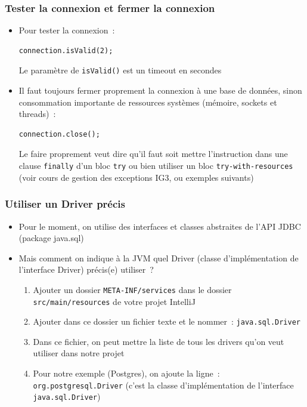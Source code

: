 \documentclass[aspectratio=169,10pt]{beamer}
\begin{document}
\begin{frame}[fragile]
	\frametitle{Tester la connexion et fermer la connexion}
	\begin{itemize}
		\item Pour tester la connexion~:
\begin{lstlisting}
connection.isValid(2);
\end{lstlisting}
Le paramètre de \texttt{isValid()} est un timeout en secondes
		\item Il faut toujours fermer proprement la connexion à une base de données, sinon consommation importante de ressources systèmes (mémoire, sockets et threads)~:
\begin{lstlisting}
connection.close();
\end{lstlisting}
		Le faire proprement veut dire qu'il faut soit mettre l'instruction dans une clause \texttt{finally} d'un bloc \texttt{try} ou bien utiliser un bloc \texttt{try-with-resources} (voir cours de gestion des exceptions IG3, ou exemples suivants)
	\end{itemize}
\end{frame}

\begin{frame}
	\frametitle{Utiliser un Driver précis}
	\begin{itemize}
		\item Pour le moment, on utilise des interfaces et classes abstraites de l'API JDBC (package java.sql)
		\item Mais comment on indique à la JVM quel Driver (classe d'implémentation de l'interface Driver) précis(e) utiliser~?
		\begin{enumerate}			 
			\item Ajouter un dossier \texttt{META-INF/services} dans le dossier \texttt{src/main/resources} de votre projet IntelliJ			
			\item Ajouter dans ce dossier un fichier texte et le nommer~: \texttt{java.sql.Driver}
			\item Dans ce fichier, on peut mettre la liste de tous les drivers qu'on veut utiliser dans notre projet
			\item Pour notre exemple (Postgres), on ajoute la ligne~:
			\texttt{org.postgresql.Driver} (c'est la classe d'implémentation de l'interface \texttt{java.sql.Driver})
		\end{enumerate}
	\end{itemize}
\end{frame}
\end{document}
